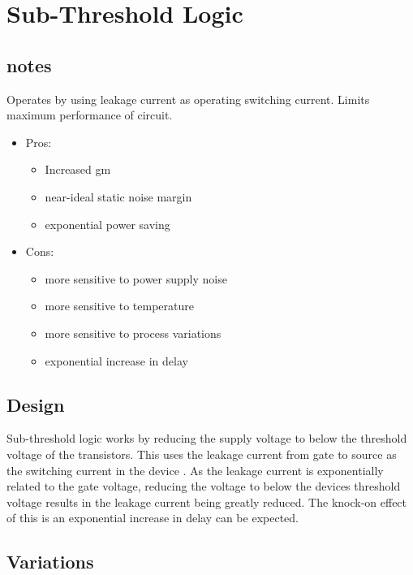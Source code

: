 \section{Sub-Threshold Logic}
\label{sec:subthresh}



\subsection{notes}

Operates by using leakage current as operating switching current.
Limits maximum performance of circuit.

\begin{itemize}

\item{Pros:}

\begin{itemize}

\item{Increased gm}
\item{near-ideal static noise margin}
\item{exponential power saving}

\end{itemize}

\item{Cons:}

\begin{itemize}

\item{more sensitive to power supply noise}
\item{more sensitive to temperature}
\item{more sensitive to process variations}
\item{exponential increase in delay}

\end{itemize}

\end{itemize}

\subsection{Design}
Sub-threshold logic works by reducing the supply voltage to below the threshold voltage of the transistors.
This uses the leakage current from gate to source as the switching current in the device \cite{ULPSubThresh}.
As the leakage current is exponentially related to the gate voltage, reducing the voltage to below the devices threshold voltage results in the leakage current being greatly reduced.
The knock-on effect of this is an exponential increase in delay can be expected.


\subsection{Variations}
